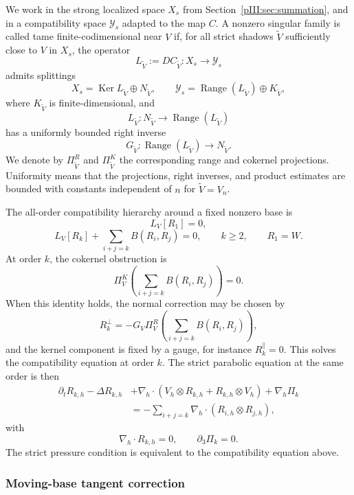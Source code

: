 \documentclass[11pt]{article}
\numberwithin{equation}{section}
\theoremstyle{plain}
\theoremstyle{definition}
\theoremstyle{remark}
\DeclareMathOperator{\Range}{Range}
\DeclareMathOperator{\Ker}{Ker}
\newcommand{\nabh}{\nabla_h}
\newcommand{\calY}{\mathcal Y}
\begin{document}
We work in the strong localized space \(X_s\) from Section~\ref{pIII:sec:summation}, and in a compatibility
space \(\calY_s\) adapted to the map \(C\).  A nonzero singular family is called tame finite-codimensional
near \(V\) if, for all strict shadows \(\widetilde V\) sufficiently close to \(V\) in \(X_s\), the operator
\[
        L_{\widetilde V}:=DC_{\widetilde V}:X_s\to\calY_s
\]
admits splittings
\[
        X_s=\Ker L_{\widetilde V}\oplus N_{\widetilde V},
        \qquad
        \calY_s=\Range(L_{\widetilde V})\oplus K_{\widetilde V},
\]
where \(K_{\widetilde V}\) is finite-dimensional, and
\[
        L_{\widetilde V}:N_{\widetilde V}\to \Range(L_{\widetilde V})
\]
has a uniformly bounded right inverse
\[
        G_{\widetilde V}:\Range(L_{\widetilde V})\to N_{\widetilde V}.
\]
We denote by \(\Pi_{\widetilde V}^R\) and \(\Pi_{\widetilde V}^K\) the corresponding range and cokernel
projections.  Uniformity means that the projections, right inverses, and product estimates are bounded
with constants independent of \(n\) for \(\widetilde V=V_n\).

The all-order compatibility hierarchy around a fixed nonzero base is
\[
        L_V[R_1]=0,
\]
\[
        L_V[R_k]+
        \sum_{i+j=k}B(R_i,R_j)=0,
        \qquad k\ge2,
        \qquad R_1=W.
\]
At order \(k\), the cokernel obstruction is
\[
        \Pi_V^K
        \left(
        \sum_{i+j=k}B(R_i,R_j)
        \right)=0.
\]
When this identity holds, the normal correction may be chosen by
\[
        R_k^\perp
        =
        -G_V\Pi_V^R
        \left(
        \sum_{i+j=k}B(R_i,R_j)
        \right),
\]
and the kernel component is fixed by a gauge, for instance \(R_k^\parallel=0\).  This solves the
compatibility equation at order \(k\).  The strict parabolic equation at the same order is then
\[
\begin{aligned}
        \partial_tR_{k,h}-\Delta R_{k,h}
        &+\nabh\cdot(V_h\otimes R_{k,h}+R_{k,h}\otimes V_h)
        +\nabh\Pi_k  \\
        &=-\sum_{i+j=k}\nabh\cdot(R_{i,h}\otimes R_{j,h}),
\end{aligned}
\]
with
\[
        \nabh\cdot R_{k,h}=0,
        \qquad
        \partial_3\Pi_k=0.
\]
The strict pressure condition is equivalent to the compatibility equation above.

\subsubsection{Moving-base tangent correction}
\end{document}
